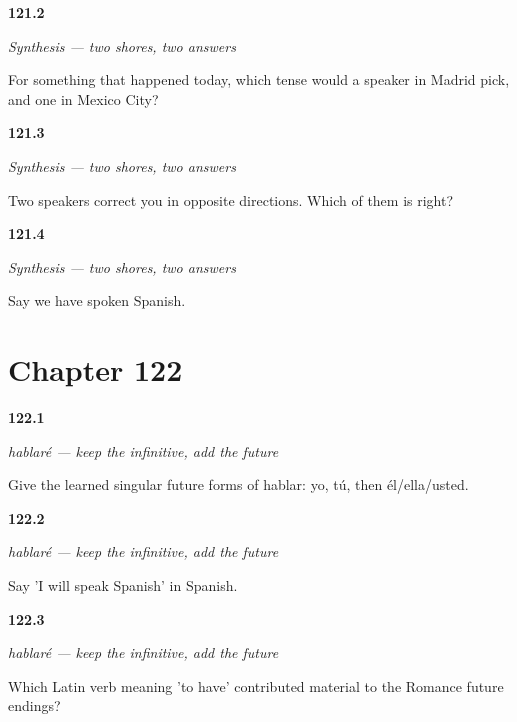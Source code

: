 \noindent\begin{minipage}[t]{\linewidth}
\raggedright
\hypertarget{review-ES-C49-sintesis-dos-orillas-split}{\textbf{121.2}} \emph{Synthesis — two shores, two answers}\par
\small For something that happened today, which tense would a speaker in Madrid pick, and one in Mexico City?
\end{minipage}\par\medskip

\noindent\begin{minipage}[t]{\linewidth}
\raggedright
\hypertarget{review-ES-C49-sintesis-dos-orillas-wrong}{\textbf{121.3}} \emph{Synthesis — two shores, two answers}\par
\small Two speakers correct you in opposite directions. Which of them is right?
\end{minipage}\par\medskip

\noindent\begin{minipage}[t]{\linewidth}
\raggedright
\hypertarget{review-ES-C49-sintesis-dos-orillas-build}{\textbf{121.4}} \emph{Synthesis — two shores, two answers}\par
\small Say we have spoken Spanish.
\end{minipage}\par\medskip

\section*{Chapter 122}

\noindent\begin{minipage}[t]{\linewidth}
\raggedright
\hypertarget{review-ES-C17-futuro-singular-forms}{\textbf{122.1}} \emph{hablaré — keep the infinitive, add the future}\par
\small Give the learned singular future forms of hablar: yo, tú, then él/ella/usted.
\end{minipage}\par\medskip

\noindent\begin{minipage}[t]{\linewidth}
\raggedright
\hypertarget{review-ES-C17-futuro-hablare-espanol}{\textbf{122.2}} \emph{hablaré — keep the infinitive, add the future}\par
\small Say 'I will speak Spanish' in Spanish.
\end{minipage}\par\medskip

\noindent\begin{minipage}[t]{\linewidth}
\raggedright
\hypertarget{review-ES-C17-futuro-history}{\textbf{122.3}} \emph{hablaré — keep the infinitive, add the future}\par
\small Which Latin verb meaning 'to have' contributed material to the Romance future endings?
\end{minipage}\par\medskip

